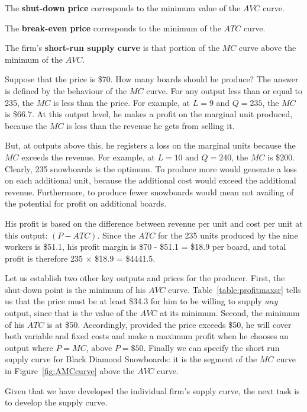 \begin{DefBox}
The \textbf{shut-down price} corresponds to the minimum value of the $AVC$ curve.

The \textbf{break-even price} corresponds to the minimum of the $ATC$ curve.

The firm's \textbf{short-run supply curve} is that portion of the $MC$ curve above the minimum of the $AVC$.
\end{DefBox}

Suppose that the price is \$70. How many boards should he produce? The answer is defined by the behaviour of the $MC$ curve. For any output less than or equal to 235, the $MC$ is less than the price. For example, at $L=9$ and $Q=235$, the $MC$ is \$66.7. At this output level, he makes a profit on the marginal unit produced, because the $MC$ is less than the revenue he gets from selling it. 

But, at outputs above this, he registers a loss on the marginal units because the $MC$ exceeds the revenue. For example, at $L=10$ and $Q=240$, the $MC$ is \$200. Clearly, 235 snowboards is the optimum. To produce more would generate a loss on each additional unit, because the additional cost would exceed the additional revenue. Furthermore, to produce fewer snowboards would mean not availing of the potential for profit on additional boards.

His profit is based on the difference between revenue per unit and cost per unit at this output: $(P-ATC)$. Since the $ATC$ for the 235 units produced by the nine workers is \$51.1, his profit margin is \$70 - \$51.1 = \$18.9 per board, and total profit is therefore 235 $\times$ \$18.9 = \$4441.5.

Let us establish two other key outputs and prices for the producer. First, the shut-down point is the minimum of his $AVC$ curve. Table~\ref{table:profitmaxsr} tells us that the price must be at least \$34.3 for him to be willing to supply \textit{any} output, since that is the value of the $AVC$ at its minimum. Second, the minimum of his $ATC$ is at \$50. Accordingly, provided the price exceeds \$50, he will cover both variable and fixed costs and make a maximum profit when he chooses an output where $P=MC$, above $P=\$50$. Finally we can specify the short run supply curve for Black Diamond Snowboards: it is the segment of the $MC$ curve in Figure~\ref{fig:AMCcurve} above the $AVC$ curve.

Given that we have developed the individual firm's supply curve, the next task is to develop the  supply curve.

